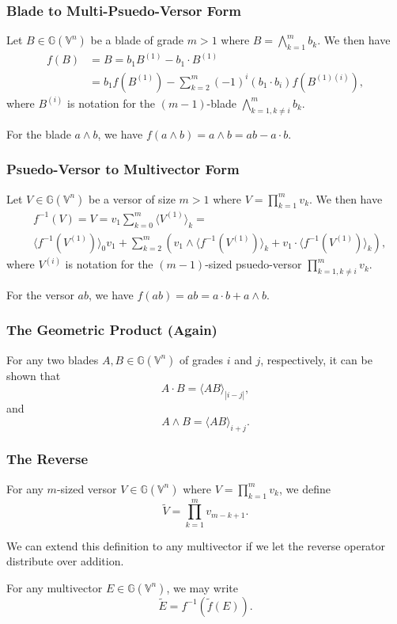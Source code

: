 \documentclass{beamer}
\newcommand{\G}{\mathbb{G}}
\newcommand{\V}{\mathbb{V}}
\begin{document}
\begin{frame}
\frametitle{Blade to Multi-Psuedo-Versor Form}
Let $B\in\G(\V^n)$ be a blade of grade $m>1$ where $B=\bigwedge_{k=1}^m b_k$.
We then have
\begin{align*}
f(B) &= B = b_1 B^{(1)} - b_1\cdot B^{(1)} \\
& = b_1 f(B^{(1)}) - \sum_{k=2}^m(-1)^i (b_1\cdot b_i)f(B^{(1)(i)}),
\end{align*}
where $B^{(i)}$ is notation for the $(m-1)$-blade $\bigwedge_{k=1,k\neq i}^m b_k$.
\begin{example}
For the blade $a\wedge b$, we have $f(a\wedge b)=a\wedge b=ab-a\cdot b$.
\end{example}
\end{frame}

\begin{frame}
\frametitle{Psuedo-Versor to Multivector Form}
Let $V\in\G(\V^n)$ be a versor of size $m>1$ where $V=\prod_{k=1}^m v_k$.
We then have
\begin{align*}
 & f^{-1}(V) = V = v_1\sum_{k=0}^m\langle V^{(1)}\rangle_k = \\
 & \langle f^{-1}(V^{(1)})\rangle_0 v_1+\sum_{k=2}^m\left(
v_1\wedge\langle f^{-1}(V^{(1)})\rangle_k + v_1\cdot\langle f^{-1}(V^{(1)})\rangle_k\right),
\end{align*}
where $V^{(i)}$ is notation for the $(m-1)$-sized psuedo-versor $\prod_{k=1,k\neq i}^m v_k$.
\begin{example}
For the versor $ab$, we have $f(ab)=ab=a\cdot b+a\wedge b$.
\end{example}
\end{frame}

\begin{frame}
\frametitle{The Geometric Product (Again)}
\begin{example}
For any two blades $A,B\in\G(\V^n)$ of grades $i$ and $j$, respectively, it
can be shown that
\begin{equation*}
A\cdot B = \langle AB\rangle_{|i-j|},
\end{equation*}
and
\begin{equation*}
A\wedge B = \langle AB\rangle_{i+j}.
\end{equation*}
\end{example}
\end{frame}

\begin{frame}
\frametitle{The Reverse}
\begin{definition}
For any $m$-sized versor $V\in\G(\V^n)$ where $V=\prod_{k=1}^m v_k$,
we define
\begin{equation*}
\tilde{V} = \prod_{k=1}^m v_{m-k+1}.
\end{equation*}
\end{definition}
We can extend this definition to any multivector if we let
the reverse operator distribute over addition.
\begin{definition}
For any multivector $E\in\G(\V^n)$, we may write
\begin{equation*}
\tilde{E} = f^{-1}(\tilde{f}(E)).
\end{equation*}
\end{definition}
\end{frame}
\end{document}
